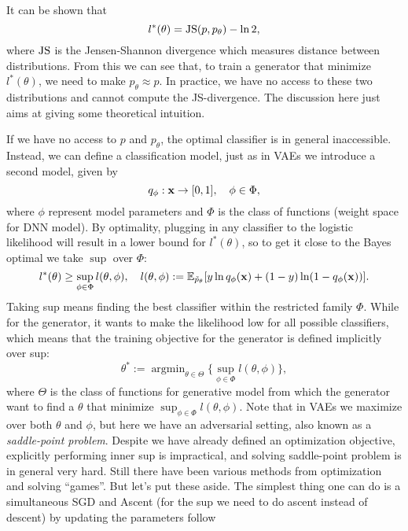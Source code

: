 \documentclass[../book-template.tex]{subfiles}
\begin{document}
It can be shown that
\begin{equation*}
	l^*(\theta)={\rm JS}(p,p_\theta)-\ln 2,
\end{equation*}
where ${\rm JS}$ is the Jensen-Shannon divergence which measures distance between distributions. From this we can see that, to train a generator that minimize $l^*(\theta)$, we need to make $p_\theta \approx p$. In practice, we have no access to these two distributions and cannot compute the JS-divergence. The discussion here just aims at giving some theoretical intuition.
\par If we have no access to $p$ and $p_\theta$, the optimal classifier is in general inaccessible. Instead, we can define a classification model, just as in VAEs we introduce a second model, given by
\begin{equation*}
	q_\phi:{\bf x}\rightarrow [0,1],\quad \phi\in\Phi,
\end{equation*}
where $\phi$ represent model parameters and $\Phi$ is the class of functions (weight space for DNN model). By optimality, plugging in any classifier to the logistic likelihood will result in a lower bound for $l^*(\theta)$, so to get it close to the Bayes optimal we take $\sup$ over $\Phi$:
\begin{equation*}
	l^*(\theta)\geq\sup_{\phi\in\Phi}l(\theta,\phi),\quad l(\theta,\phi) :=\mathbb{E}_{\tilde{p}_\theta}[y\ln q_\phi({\bf x})+(1-y)\ln(1-q_\phi({\bf x}))].
\end{equation*}
Taking sup means finding the best classifier within the restricted family ${\Phi}$. While for the generator, it wants to make the likelihood low for all possible classifiers, which means that the training objective for the generator is defined implicitly over sup:
\begin{equation*}
	\theta^*:=\mathop{\arg\min}_{\theta\in\Theta}\{\sup_{\phi\in\Phi}l(\theta,\phi)\},
\end{equation*}
where ${\Theta}$ is the class of functions for generative model from which the generator want to find a ${\theta}$ that minimize $\sup_{\phi\in\Phi}l(\theta,\phi)$. Note that in VAEs we maximize over both $\theta$ and $\phi$, but here we have an adversarial setting, also known as a \emph{saddle-point problem}. Despite we have already defined an optimization objective, explicitly performing inner sup is impractical, and solving saddle-point problem is in general very hard. Still there have been various methods from optimization and solving ``games''. But let's put these aside. The simplest thing one can do is a simultaneous SGD and Ascent (for the sup we need to do ascent instead of descent) by updating the parameters follow
\end{document}
